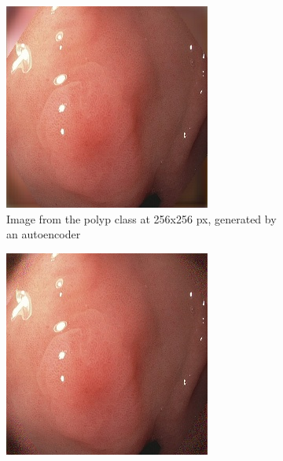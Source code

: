        \begin{figure}
        \centering
        \begin{subfigure}[t]{0.4\textwidth}
            \centering
            \includegraphics[width=\textwidth]{experiments/figures/blackcorner/polypAE.jpg}
            \caption{Image from the polyp class at 256x256 px, generated by an autoencoder }    
            \label{fig:polyp_AE_CORNER1}
        \end{subfigure}
        \qquad
        \begin{subfigure}[t]{0.4\textwidth}  
            \centering 
            \includegraphics[width=\textwidth]{experiments/figures/blackcorner/polypGAN.jpg}

\end{subfigure}
\end{figure}
